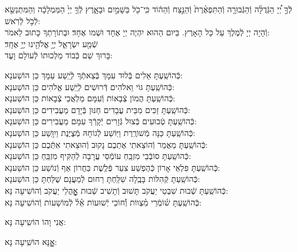 \documentclass[twoside, openany, parskip=half, 11pt]{book}
\begin{document}
\begin{sometimes}
 לְֿךָ֣ יְ֠יָ הַגְּֿדֻלָּ֨ה וְֿהַגְּֿבוּרָ֤ה וְֿהַתִּפְאֶ֨רֶת֙ וְֿהַנֵּ֣צַח וְֿהַה֔וֹד
 כִּֽי־כֹ֖ל בַּשָּׁמַ֣יִם וּבָאָ֑רֶץ לְֿךָ֤ יְיָ֙ הַמַּמְלָכָ֔ה
וְהַמִּתְנַשֵּׂ֖א לְֿכֹ֥ל לְֿרֹֽאשׁ:\\
 וְֿהָיָה יְיָ לְֿמֶלֶךְ עַל כָּל הָאָרֶץ. בַּיּום הַהוּא יִהְיֶה יְיָ אֶחָד וּשְׁמו אֶחָד׃ וּבְתוֹרָתְךָ כָּתוּב לֵאמֹר: \\
 שְֿׁמַ֖ע יִשְׂרָאֵ֑ל יְיָ֥ אֱלֹהֵ֖ינוּ יְיָ֥ אֶחָֽד׃\\
 בָּרוּךְ שֵׁם כְּֿבוֹד מַלְכוּתוֹ לְֿעוֹלָם וָעֶד:

\begin{small}
כְּֿהוֹשַֽׁעְתָּ אֵלִים בְּֿלוּד עִמָּךְ בְּֿצֵאתְֿךָ לְֿיֵֽשַׁע עַמָּךְ \hfill כֵּן הוֹשַׁענָא: \\
כְּֿהוֹשַֽׁעְתָּ גּוֹי וֵאלֹהִים דְּֿרוּשִׁים לְֿיֵֽשַׁע אֱלֹהִים \hfill כֵּן הוֹשַׁענָא: \\
כְּֿהוֹשַֽׁעְתָּ הֲמוֹן צְֿבָאוֹת וְֿעִמָּם מַלְאֲכֵי צְֿבָאוֹת \hfill כֵּן הוֹשַׁענָא: \\
כְּֿהוֹשַֽׁעְתָּ זַכִּים מִבֵּית עֲבָדִים חַנּוּן בְּֿיָדָם מַעֲבִידִים \hfill כֵּן הוֹשַׁענָא: \\
כְּֿהוֹשַֽׁעְתָּ טְֿבוּעִים בְּֿצוּל גְּֿזָרִים יְֿקָרְֿךָ עִמָּם מַעֲבִירִים \hfill כֵּן הוֹשַׁענָא: \\
כְּֿהוֹשַֽׁעְתָּ כַּנָּה מְֿשׁוֹרֶֽרֶת וַיּֽוֹשַׁע לְֿגוֹחָהּ מְֿצֻיֶּנֶת וַיִוָּֽשַׁע \hfill כֵּן הוֹשַׁענָא: \\
כְּֿהוֹשַֽׁעְתָּ מַאֲמַר וְֿהוֹצֵאתִי אֶתְכֶם נָקוּב וְֿהוּצֵאתִי אִתְּֿכֶם \hfill כֵּן הוֹשַׁענָא:\\
כְּֿהוֹשַֽׁעְתָּ סוֹבְֿבֵי מִזְבֵּֽחַ עוֹמְֿסֵי עֲרָבָה לְֿהַקִּיף מִזְבֵּֽחַ \hfill כֵּן הוֹשַׁענָא: \\
כְּֿהוֹשַֽׁעְתָּ פִּלְאֵי אָרוֹן כְּֿהֻפְשַׁע צִעֵר פְּֿלֶֽשֶׁת בַּחֲרוֹן אַף וְֿנוֹשַׁע \hfill כֵּן הוֹשַׁענָא: \\
כְּֿהוֹשַֽׁעְתָּ קְֿהִלּוֹת בָּבֶֽלָה שִׁלַּֽחְתָּ רַחוּם לְֿמַעֲנָם שֻׁלַּחְתָּ \hfill כֵּן הוֹשַׁענָא:\\
כְּֿהוֹשַֽׁעְתָּ שְֿׁבוּת שִׁבְטֵי יַעֲקֹב תָּשׁוּב וְֿתָשִׁיב שְֿׁבוּת אׇׇׇׇׇׇׇׇָהֳלֵי יַעֲקֹב \hfill וְֿהוֹשִׁיעָה נָּא:\\
 כְּֿהוֹשַֽׁעְתָּ שׁ֗וֹמְֿרֵי מִ֗צְווֹת וְֿ֗חוֹכֵי יְֿשׁוּעוֹת אֵ֗ל֗ לְֿמוֹשָׁעוֹת \hfill וְֿהוֹשִׁיעָה נָּא:

\end{small}

\begin{large}
\chazzan
אֲנִי וָהוֹ הוֹשִֽיעָה נָּא:

\shatzvkahal
 אׇׇׇׇָנָּא הוֹשִֽׁיעָה נָּא:

\end{large}


\end{sometimes}
\end{document}
